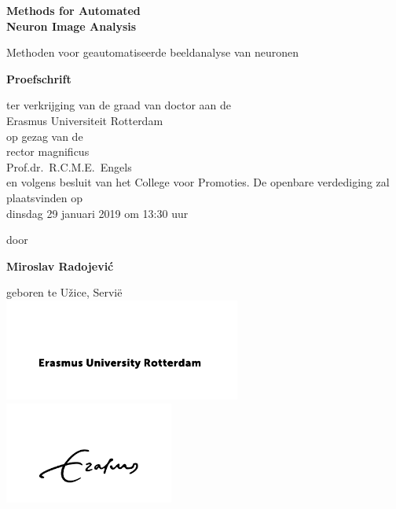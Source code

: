 %
%

\setlength{\parindent}{0pt}
\thispagestyle{empty}

\begin{center}
  
  \vspace*{5mm}
  {\huge\bf Methods for Automated\\[0.3ex] Neuron Image Analysis\\}

  \vfill
  \vfill
  \vfill

  {\large Methoden voor geautomatiseerde beeldanalyse van neuronen\\[1ex]}


  \vfill
  \vfill
  \vfill
  \vfill

  {\large\bf Proefschrift}
  {\large 
  \vfill
  \vfill
  
  \normalsize
  
  ter verkrijging van de graad van doctor aan de \\Erasmus Universiteit Rotterdam\\
op gezag van de \\rector magnificus\\
  \vfill
Prof.dr.~R.C.M.E.~Engels\\ 
  \vfill
en volgens besluit van het College voor Promoties. 
  \vfill
De openbare verdediging zal plaatsvinden op \\dinsdag 29 januari 2019 om 13:30 uur
  
  
  \vfill
  \vfill
  
  \large
  door}

  \vfill
  \vfill
  \vfill

  {\large\bf Miroslav Radojevi\'{c}}

  \vfill

  {\large geboren te U\v{z}ice, Servi{\"e}}\\
\includegraphics[height=9em]{./logos/EUR_line_02_RGB_black}
\includegraphics[height=9em]{./logos/EUR_signature_02_RGB_black}
\end{center}


